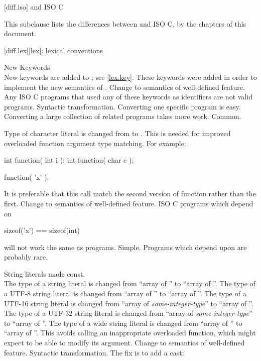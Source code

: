 
[diff.iso]{\Cpp{} and ISO C}

\pnum
{}%
This subclause lists the differences between \Cpp{} and
ISO C, by the chapters of this document.

[diff.lex]{\ref{lex}: lexical conventions}

\change
New Keywords\\
New keywords are added to \Cpp{};
see \ref{lex.key}.
\rationale
These keywords were added in order to implement the new
semantics of \Cpp{}.
\effect
Change to semantics of well-defined feature.
Any ISO C programs that used any of these keywords as identifiers
are not valid \Cpp{} programs.
\difficulty
Syntactic transformation.
Converting one specific program is easy.
Converting a large collection
of related programs takes more work.
\howwide
Common.

\change
Type of character literal is changed from  to .
\rationale
This is needed for improved overloaded function argument type
matching.
For example:

\begin{codeblock}
int function( int i );
int function( char c );

function( 'x' );
\end{codeblock}

It is preferable that this call match the second version of
function rather than the first.
\effect
Change to semantics of well-defined feature.
ISO C programs which depend on

\begin{codeblock}
sizeof('x') == sizeof(int)
\end{codeblock}

will not work the same as \Cpp{} programs.
\difficulty
Simple.
\howwide
Programs which depend upon  are probably rare.

\change
String literals made const.\\
The type of a string literal is changed
from ``array of ''
to ``array of ''.
The type of a UTF-8 string literal is changed
from ``array of ''
to ``array of ''.
The type of a UTF-16 string literal is changed
from ``array of \textit{some-integer-type}''
to ``array of ''.
The type of a UTF-32 string literal is changed
from ``array of \textit{some-integer-type}''
to ``array of ''.
The type of a wide string literal is changed
from ``array of ''
to ``array of ''.
\rationale
This avoids calling an inappropriate overloaded function,
which might expect to be able to modify its argument.
\effect
Change to semantics of well-defined feature.
\difficulty
Syntactic transformation. The fix is to add a cast:

